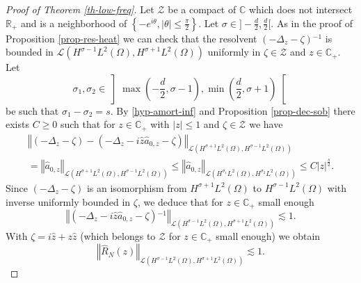 \documentclass[10pt, a4paper,reqno]{amsart}
\theoremstyle{plain}
\theoremstyle{definition}
\theoremstyle{remark}
\begin{document}
\begin{proof}[Proof of Theorem \ref{th-low-freq}]
{\noindent {\bf $\bullet$}\quad } 
Let ${{\mathcal Z}}$ be a compact of ${\mathbb{C}}$ which does not intersect ${\mathbb{R}}_+$ and is a neighborhood of ${\left\{ {-e^{i{\theta}}, {\left\vert {\theta}\right\vert} {\leqslant} \frac \pi 2} \right\}}$.
Let ${\sigma} \in \big] - \frac d 2, \frac d 2 \big[$. 
As in the proof of Proposition \ref{prop-res-heat} we can check that the resolvent $(-{{\Delta}_z}  - {\zeta} ){^{-1}}$ is bounded in ${{\mathcal L}}(H^{{\sigma}-1}L^2({\Omega}),H^{{\sigma}+1}L^2({\Omega}))$ uniformly in ${\zeta} \in {{\mathcal Z}}$ and $z \in {\mathbb{C}}_+$.
Let
\[
{\sigma}_1 , {\sigma}_2 \in \left] \max\left( - \frac d 2 , {\sigma}-1 \right) , \min \left( \frac d 2 , {\sigma}+1 \right) \right[
\]
be such that ${\sigma}_1 - {\sigma}_2 = s$.
By \eqref{hyp-amort-inf} and Proposition \ref{prop-dec-sob} there exists $C {\geqslant} 0$ such that for $z \in {\mathbb{C}}_+$ with ${\left\vert z\right\vert} {\leqslant} 1$ and ${\zeta} \in {{\mathcal Z}}$ we have 
\begin{multline*}
{\left\Vert { (-{{\Delta}_z}  - {\zeta}) - (-{{\Delta}_z}  - i \hat z \hat a_{0,z} - {\zeta})}\right\Vert} _{{{\mathcal L}}(H^{{\sigma}+1}L^2({\Omega}),H^{{\sigma}-1}L^2({\Omega}))}\\
= {\left\Vert {\hat a_{0,z}}\right\Vert} _{{{\mathcal L}}(H^{{\sigma}+1}L^2({\Omega}),H^{{\sigma}-1}L^2({\Omega}))}
{\leqslant} {\left\Vert {\hat a_{0,z}}\right\Vert} _{{{\mathcal L}}(H^{{\sigma}_1}L^2({\Omega}),H^{{\sigma}_2}L^2({\Omega}))} {\leqslant} C {\left\vert z\right\vert}^{\frac s 2}.
\end{multline*}
Since $(-{{\Delta}_z}-{\zeta})$ is an isomorphism from $H^{{\sigma}+1}L^2({\Omega})$ to $H^{{\sigma}-1}L^2({\Omega})$ with inverse uniformly bounded in ${\zeta}$, we deduce that for $z \in {\mathbb{C}}_+$ small enough
\[
{\left\Vert {(-{{\Delta}_z}  - i \hat z \hat a_{0,z} - {\zeta}){^{-1}}}\right\Vert}_{{{\mathcal L}}(H^{{\sigma}-1}L^2({\Omega}),H^{{\sigma}+1}L^2({\Omega}))} \lesssim 1.
\]
With ${\zeta} = i \hat z + z \hat z$ (which belongs to ${{\mathcal Z}}$ for $z \in {\mathbb{C}}_+$ small enough) we obtain
\begin{equation} \label{estim-hatRN}
{\left\Vert {\hat R_N(z)}\right\Vert}_{{{\mathcal L}}(H^{{\sigma}-1}L^2({\Omega}),H^{{\sigma}+1}L^2({\Omega}))} \lesssim 1.
\end{equation}


\end{proof}
\end{document}

